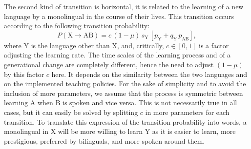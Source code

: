 \documentclass[../thesis.tex]{subfiles}
\begin{document}
The second kind of transition is horizontal, it is related to the learning of a new
language by a monolingual in the course of their lives. This transition occurs according
to the following transition probability:
\begin{equation}
  P (\text{X} \rightarrow \text{AB}) = c \, (1 - \mu) \, s_\text{Y} \, \left[ p_\text{Y} + q_\text{Y} \,  p_{\text{AB}} \right],
\end{equation}
where Y is the language other than X, and, critically, $c \in [0, 1]$ is a factor
adjusting the learning rate. The time scales of the learning process and of a
generational change are completely different, hence the need to adjust $(1-\mu)$ by this
factor $c$ here. It depends on the similarity between the two languages and on the
implemented teaching policies. For the sake of simplicity and to avoid the inclusion of
more parameters, we assume that the process is symmetric between learning A when B is
spoken and vice versa. This is not necessarily true in all cases, but it can easily be
solved by splitting $c$ in more parameters for each transition. To translate this
expression of the transition probability into words, a monolingual in X will be more
willing to learn Y as it is easier to learn, more prestigious, preferred by bilinguals,
and more spoken around them.
\end{document}
